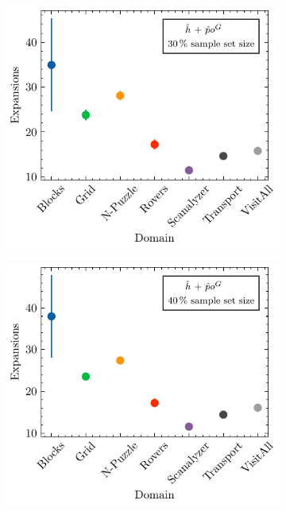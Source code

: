 \documentclass[ppgc,diss,english]{iiufrgs}
\begin{document}
\begin{figure}[tb]
  \vspace{0.5cm}

  \begin{subfigure}{0.41\textwidth}
    \centering
    \includegraphics[width=\linewidth]{img/error_hNN_poG_30pct.pdf}
  \end{subfigure}
  \begin{subfigure}{0.41\textwidth}
    \centering
    \includegraphics[width=\linewidth]{img/error_hNN_poG_40pct.pdf}
  \end{subfigure}


\end{figure}
\end{document}
